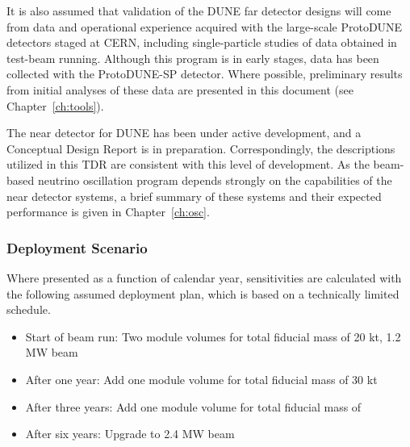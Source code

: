 It is also assumed that validation of the DUNE far detector 
designs will come from data and operational experience acquired 
with the large-scale ProtoDUNE detectors staged at CERN, 
including single-particle studies of data obtained 
in test-beam running.  Although this program is in early stages, 
data has been collected with the ProtoDUNE-SP detector.  
Where possible, preliminary results from initial analyses of these 
data are presented in this document (see Chapter~\ref{ch:tools}).

The near detector for DUNE has been under active development,
and a Conceptual Design Report is in preparation.
Correspondingly, the descriptions utilized in this TDR
are consistent with this level of development.  As the
beam-based neutrino oscillation program depends strongly
on the capabilities of the near detector systems, a brief
summary of these systems and their expected performance is
given in Chapter~\ref{ch:osc}.

\subsubsection{Deployment Scenario}
\label{sec:exec-assm-meth-deployment}

Where presented as a function of calendar year,
sensitivities are calculated with the following
assumed deployment plan, which is based on a
technically limited schedule.
\begin{itemize}
    \item Start of beam run: Two  module %
    volumes for total fiducial mass of 20 kt, 1.2 MW beam
    \item After one year: Add one  module  volume for total fiducial mass of 30 kt
    \item After three years: Add one  module  volume for total fiducial mass of \fdfiducialmass
    \item After six years: Upgrade to 2.4 MW beam
\end{itemize}




